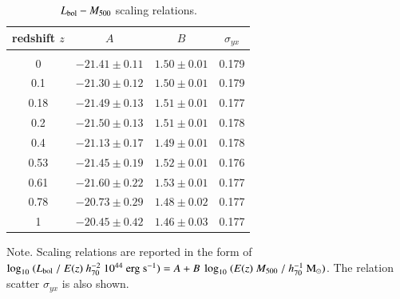 \documentclass[useAMS,usenatbib]{mn2e}
\begin{document}
\begin{table} 
\begin{center}
\caption{$L_{{\mathrm{bol}}}-M_{500}$ scaling relations.}
\medskip
\begin{tabular}{cccc}
\hline
\phantom{\Big|}
redshift $z$ & $A$ & $B$ & $\sigma_{yx}$ \\
\hline \\[-0.5em]
 0      & $-21.41\pm0.11$ & $1.50\pm0.01$ & 0.179\\
 0.1   & $-21.30\pm0.12$ & $1.50\pm0.01$ & 0.179\\
 0.18   & $-21.49\pm0.13$ & $1.51\pm0.01$ & 0.177\\
 0.2   & $-21.50\pm0.13$ & $1.51\pm0.01$ & 0.178\\ 
 0.4   & $-21.13\pm0.17$ & $1.49\pm0.01$ & 0.178\\ 
 0.53   & $-21.45\pm0.19$ & $1.52\pm0.01$ & 0.176\\
 0.61 & $-21.60\pm0.22$ & $1.53\pm0.01$ & 0.177\\ 
 0.78 & $-20.73\pm0.29$ & $1.48\pm0.02$ & 0.177\\ 
 1      & $-20.45\pm0.42$ & $1.46\pm0.03$ & 0.177\\[0.5em]
\hline
\end{tabular}
\label{tab:LMfits}
\end{center}
\footnotesize{Note. Scaling relations are reported in the form of $\log_{10}~(L_{{\mathrm{bol}}}~/~E(z)~h_{70}^{-2}~10^{44}~{\mathrm{erg~s}}^{-1})=A+B~\log_{10}~(E(z)~M_{500}~/~h_{70}^{-1}~{\mathrm{M_{\odot}}})$. The relation scatter $\sigma_{yx}$ is also shown.}
\end{table}
 
\end{document}
